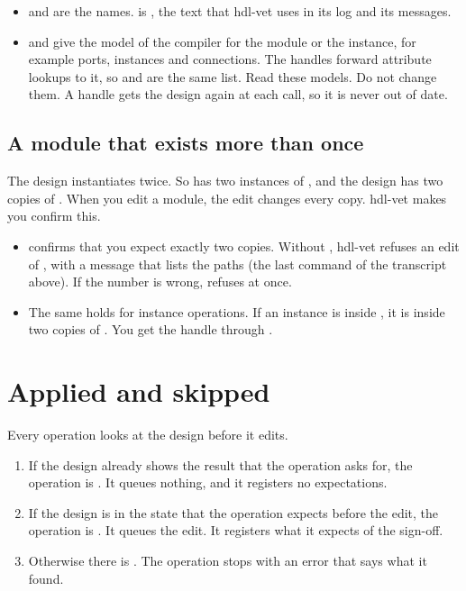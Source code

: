 \begin{itemize}
  paths above. It is an attribute of the model that  returns, and the
  handle forwards it (see the last item). Scripts use it to read and edit the text of the
  module with  and .
\item {} and  are the names. 
  is , the text that hdl-vet uses in its log and its
  messages.
\item {} and  give the model of the compiler for
  the module or the instance, for example ports, instances and connections. The
  handles forward attribute lookups to it, so  and
   are the same list. Read these models. Do not change them.
  A handle gets the design again at each call, so it is never out of date.
\end{itemize}

\subsection*{A module that exists more than once}

The design instantiates  twice. So  has two instances of
, and the design has two copies of . When you edit a module, the
edit changes every copy. hdl-vet makes you confirm this.

\begin{itemize}
\item {} confirms that you expect exactly
  two copies. Without , hdl-vet refuses an edit of , with a
  message that lists the paths (the last command of the transcript above). If the
  number is wrong,  refuses at once.
\item The same holds for instance operations. If an instance is inside ,
  it is inside two copies of . You get the handle through
  .
\end{itemize}

\section{Applied and skipped}
\label{sec:applied}

Every operation looks at the design before it edits.

\begin{enumerate}
\item If the design already shows the result that the operation asks for, the
  operation is . It queues nothing, and it registers no
  expectations.
\item If the design is in the state that the operation expects before the edit, the
  operation is . It queues the edit. It registers what it
  expects of the sign-off.
\item Otherwise there is . The operation stops with an error that
  says what it found.
\end{enumerate}

